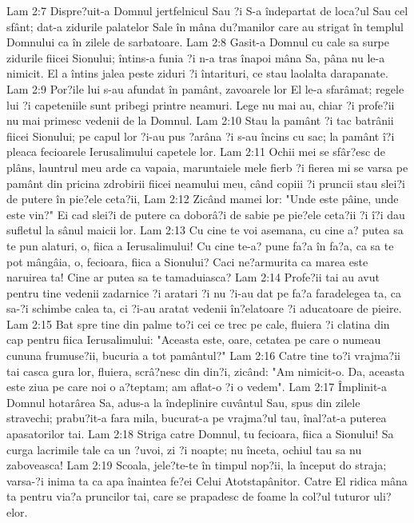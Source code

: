 Lam 2:7  Dispre?uit-a Domnul jertfelnicul Sau ?i S-a îndepartat de loca?ul Sau cel sfânt; dat-a zidurile palatelor Sale în mâna du?manilor care au strigat în templul Domnului ca în zilele de sarbatoare.
Lam 2:8  Gasit-a Domnul cu cale sa surpe zidurile fiicei Sionului; întins-a funia ?i n-a tras înapoi mâna Sa, pâna nu le-a nimicit. El a întins jalea peste ziduri ?i întarituri, ce stau laolalta darapanate.
Lam 2:9  Por?ile lui s-au afundat în pamânt, zavoarele lor El le-a sfarâmat; regele lui ?i capeteniile sunt pribegi printre neamuri. Lege nu mai au, chiar ?i profe?ii nu mai primesc vedenii de la Domnul.
Lam 2:10  Stau la pamânt ?i tac batrânii fiicei Sionului; pe capul lor ?i-au pus ?arâna ?i s-au încins cu sac; la pamânt î?i pleaca fecioarele Ierusalimului capetele lor.
Lam 2:11  Ochii mei se sfâr?esc de plâns, launtrul meu arde ca vapaia, maruntaiele mele fierb ?i fierea mi se varsa pe pamânt din pricina zdrobirii fiicei neamului meu, când copiii ?i pruncii stau slei?i de putere în pie?ele ceta?ii,
Lam 2:12  Zicând mamei lor: "Unde este pâine, unde este vin?" Ei cad slei?i de putere ca doborâ?i de sabie pe pie?ele ceta?ii ?i î?i dau sufletul la sânul maicii lor.
Lam 2:13  Cu cine te voi asemana, cu cine a? putea sa te pun alaturi, o, fiica a Ierusalimului! Cu cine te-a? pune fa?a în fa?a, ca sa te pot mângâia, o, fecioara, fiica a Sionului? Caci ne?armurita ca marea este naruirea ta! Cine ar putea sa te tamaduiasca?
Lam 2:14  Profe?ii tai au avut pentru tine vedenii zadarnice ?i aratari ?i nu ?i-au dat pe fa?a faradelegea ta, ca sa-?i schimbe calea ta, ci ?i-au aratat vedenii în?elatoare ?i aducatoare de pieire.
Lam 2:15  Bat spre tine din palme to?i cei ce trec pe cale, fluiera ?i clatina din cap pentru fiica Ierusalimului: "Aceasta este, oare, cetatea pe care o numeau cununa frumuse?ii, bucuria a tot pamântul?"
Lam 2:16  Catre tine to?i vrajma?ii tai casca gura lor, fluiera, scrâ?nesc din din?i, zicând: "Am nimicit-o. Da, aceasta este ziua pe care noi o a?teptam; am aflat-o ?i o vedem".
Lam 2:17  Împlinit-a Domnul hotarârea Sa, adus-a la îndeplinire cuvântul Sau, spus din zilele stravechi; prabu?it-a fara mila, bucurat-a pe vrajma?ul tau, înal?at-a puterea apasatorilor tai.
Lam 2:18  Striga catre Domnul, tu fecioara, fiica a Sionului! Sa curga lacrimile tale ca un ?uvoi, zi ?i noapte; nu înceta, ochiul tau sa nu zaboveasca!
Lam 2:19  Scoala, jele?te-te în timpul nop?ii, la început do straja; varsa-?i inima ta ca apa înaintea fe?ei Celui Atotstapânitor. Catre El ridica mâna ta pentru via?a pruncilor tai, care se prapadesc de foame la col?ul tuturor uli?elor.
